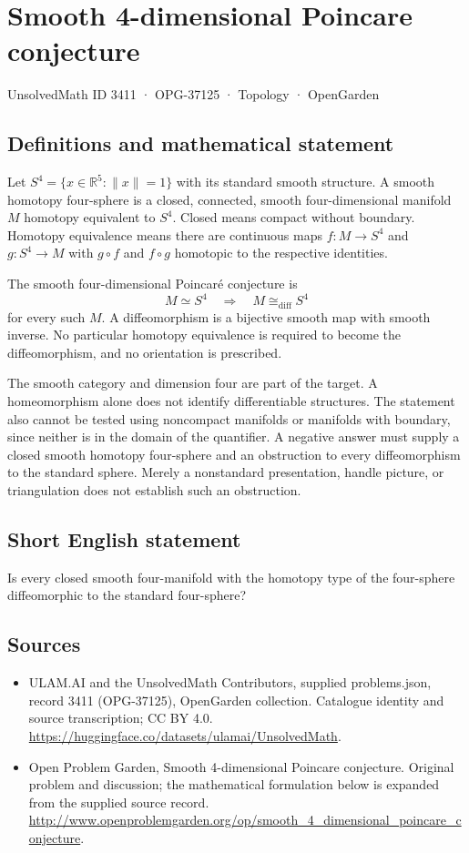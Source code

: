 \documentclass[11pt,a4paper]{article}
\begin{document}
\section*{Smooth 4-dimensional Poincare conjecture}\label{3411}
{\small UnsolvedMath ID 3411 · OPG-37125 · Topology · OpenGarden}
\subsection{Definitions and mathematical statement}
Let $S^4=\{x\in\mathbb R^5:\|x\|=1\}$ with its standard smooth
structure. A smooth homotopy four-sphere is a closed, connected,
smooth four-dimensional manifold $M$ homotopy equivalent to $S^4$.
Closed means compact without boundary. Homotopy equivalence means
there are continuous maps $f:M\to S^4$ and $g:S^4\to M$ with
$g\circ f$ and $f\circ g$ homotopic to the respective identities.

The smooth four-dimensional Poincar\'e conjecture is
\[
 M\simeq S^4\quad\Longrightarrow\quad
                    M\cong_{\mathrm{diff}}S^4
\]
for every such $M$. A diffeomorphism is a bijective smooth map with
smooth inverse. No particular homotopy equivalence is required to
become the diffeomorphism, and no orientation is prescribed.

The smooth category and dimension four are part of the target.
A homeomorphism alone does not identify differentiable structures.
The statement also cannot be tested using noncompact manifolds or
manifolds with boundary, since neither is in the domain of the
quantifier. A negative answer must supply a closed smooth homotopy
four-sphere and an obstruction to every diffeomorphism to the
standard sphere. Merely a nonstandard presentation, handle picture,
or triangulation does not establish such an obstruction.
\subsection{Short English statement}
Is every closed smooth four-manifold with the homotopy type of the four-sphere diffeomorphic to the standard four-sphere?
\subsection{Sources}
\begin{itemize}
\item[S1] ULAM.AI and the UnsolvedMath Contributors, supplied problems.json, record 3411 (OPG-37125), OpenGarden collection. Catalogue identity and source transcription; CC BY 4.0.
\url{https://huggingface.co/datasets/ulamai/UnsolvedMath}.
\item[S2] Open Problem Garden, Smooth 4-dimensional Poincare conjecture. Original problem and discussion; the mathematical formulation below is expanded from the supplied source record.
\url{http://www.openproblemgarden.org/op/smooth_4_dimensional_poincare_conjecture}.
\end{itemize}
\end{document}
